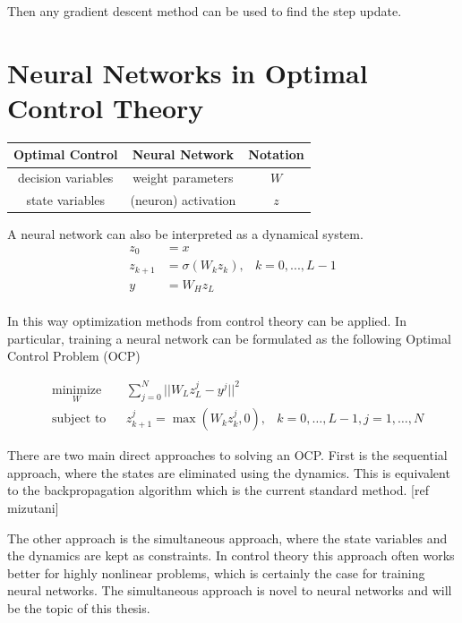  Then any gradient descent method can be used to find the step update.


\section{Neural Networks in Optimal Control Theory}

\begin{table}
\begin{tabular}{c | c | c }
Optimal Control & Neural Network & Notation\\ \hline
decision variables & weight parameters & $W$\\
state variables & (neuron) activation & $z$\\
\end{tabular}
\end{table}

A neural network can also be interpreted as a dynamical system.
\begin{equation*}
	\begin{aligned}
	z_0 &= x \\
	z_{k+1} &= \sigma(W_kz_k), & k = 0,...,L-1 \\
	y &= W_Hz_L \\
	\end{aligned}
\end{equation*}

In this way optimization methods from control theory can be applied. In particular, training a neural network can be formulated as the following Optimal Control Problem (OCP)

\begin{equation}
	\begin{aligned}
	& \underset{W}{\text{minimize}}
	& & \sum\limits_{j=0}^{N}||W_Lz_L^j - y^j||^2 \\
	& \text{subject to}
	& & z_{k+1}^j = \max(W_kz_k^j,0), &k = 0,\ldots,L-1,j = 1,\ldots,N
	\end{aligned}
	\label{ocp-eq}
\end{equation}


There are two main direct approaches to solving an OCP. First is the sequential approach, where the states are eliminated using the dynamics. This is equivalent to the backpropagation algorithm which is the current standard method. [ref mizutani]

The other approach is the simultaneous approach, where the state variables and the dynamics are kept as constraints. In control theory this approach often works better for highly nonlinear problems, which is certainly the case for training neural networks. The simultaneous approach is novel to neural networks and will be the topic of this thesis.

